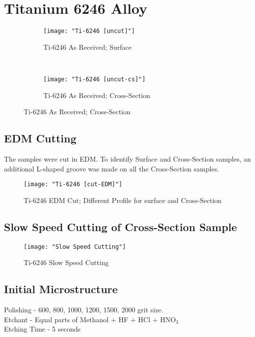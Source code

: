 \section{Titanium 6246 Alloy} 

\begin{figure}[H]
    \centering
    \begin{subfigure}{0.40\textwidth}
        \texttt{[image: "Ti-6246 [uncut]"]}
        \caption{Ti-6246 As Received; Surface}
        \label{fig:2a}
    \end{subfigure}
    ~
    \begin{subfigure}{0.40\textwidth}
        \texttt{[image: "Ti-6246 [uncut-cs]"]}
        \caption{Ti-6246 As Received; Cross-Section}
        \label{fig:2b}
    \end{subfigure}
    \label{fig:As-Received}
\end{figure}


\subsection{EDM Cutting}
The samples were cut in EDM. To identify Surface and Cross-Section samples, an additional L-shaped groove was made on all the Cross-Section samples. 

\begin{figure}[H]
    \centering
        \texttt{[image: "Ti-6246 [cut-EDM]"]}
        \caption{Ti-6246 EDM Cut; Different Profile for surface and Cross-Section}
    \label{fig:EDM-Cut}
\end{figure}

\newpage
\renewcommand{\workingDate}{\textsc{2017 $|$ August $|$ 14}}

\subsection{Slow Speed Cutting of Cross-Section Sample}

\begin{figure}[H]
    \centering
        \texttt{[image: "Slow Speed Cutting"]}
        \caption{Ti-6246 Slow Speed Cutting}
    \label{fig:slow-speed-Cut}
\end{figure}



\subsection{Initial Microstructure}
Polishing - 600, 800, 1000, 1200, 1500, 2000 grit size. \\
Etchant - Equal parts of Methanol + HF + HCl + HNO$_{3}$ \\
Etching Time - 5 seconds

